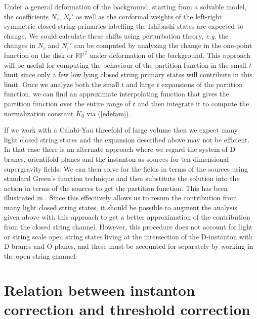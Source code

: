 \documentclass[12pt,a4paper]{article}
\newcommand{\refb}[1]{(\ref{#1})}
\begin{document}
Under a general
deformation of the background, starting from a solvable model,
the coefficients $N_r$, $N_r'$ as well as the conformal weights of the left-right symmetric
closed string primaries
labelling the Ishibashi states are expected to change. We could calculate these
shifts using perturbation theory, {\it e.g.} the changes in $N_r$ and $N_r'$ can be computed
by analyzing the change in the one-point function on the disk or $\mathbb{RP}^2$ under
deformation of the background.
This approach will be useful for computing the
behaviour of the partition function in the small $t$ limit since only a few low lying
closed string primary states will contribute in this limit. Once we analyze both the small $t$
and large $t$ expansions of the partition function, we can find an approximate interpolating
function that gives the partition function over the entire range of $t$ and then integrate it
to compute the normalization constant $K_0$ via \refb{edefam}.


If we work with a Calabi-Yau threefold of large volume then we expect many light closed string
states and the expansion described above may not be efficient. In that case there is an
alternate approach where we regard the system of D-branes, orientifold planes and the instanton
as sources for ten-dimensional supergravity fields. We can then solve for the fields in terms
of the sources using standard Green's function technique and then substitute the solution
into the action in terms
of the sources to get the partition function. This has been illustrated in \cite{Baumann:2006th}.
Since this effectively allows us to resum
the contribution from many light closed string states, it
should be possible to augment the analysis given above with this approach to get a better
approximation of the contribution from the closed string channel.
However, this procedure does not account for light or string scale open string states living at
the intersection of the D-instanton with D-branes and O-planes, and these must be
accounted for separately by working in the open string channel.


\section{Relation between instanton correction and threshold correction} \label{sF}
\end{document}
